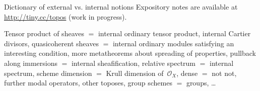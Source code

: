 \documentclass[table]{beamer}
\renewcommand{\O}{\mathcal{O}}
\begin{document}
\begin{frame}[t]
\begin{columns}[t]
\begin{column}{0.3\textwidth}
  \vspace{1cm}
  \begin{alertblock}{Dictionary of external vs. internal notions}
    Expository notes are available at \url{http://tiny.cc/topos} (work in
    progress).
  \end{alertblock}
  \tiny\rmfamily\justifying
  Tensor product of sheaves $=$ internal ordinary tensor product,
  internal Cartier divisors,
  quasicoherent sheaves $=$ internal ordinary modules satisfying an interesting
  condition,
  more metatheorems about spreading of properties,
  pullback along immersions $=$ internal sheafification,
  relative spectrum $=$ internal spectrum,
  scheme dimension $=$ Krull dimension of~$\O_X$,
  dense $=$ not not,
  further modal operators,
  other toposes,
  group schemes $=$ groups,
  \ldots
\end{column}

\end{columns}\end{frame}
\end{document}
